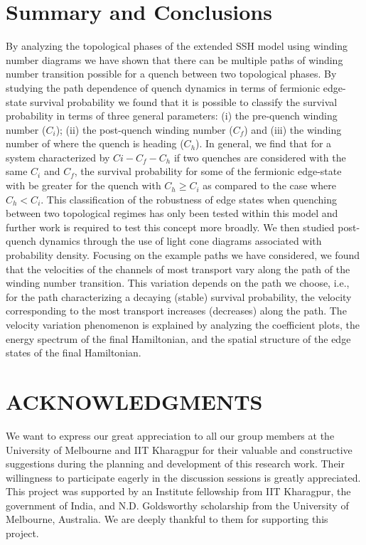 \documentclass[aps,pra,reprint,superscriptaddress,longbibliography]{revtex4-2}
\begin{document}
   \section{Summary and Conclusions}
By analyzing the topological phases of the extended SSH model using winding number diagrams we have shown that there can be multiple paths of winding number transition possible for a quench between two topological phases. By studying the path dependence of quench dynamics in terms of fermionic edge-state survival probability we found that it is possible to classify the survival probability in terms of three general parameters: (i) the pre-quench winding number ($C_i$); (ii) the post-quench winding number ($C_f$) and (iii) the winding number of where the quench is heading ($C_h$). In general, we find that for a system characterized by $Ci-C_f-C_h$ if two quenches are considered with the same $C_i$ and $C_f$, the survival probability for some of the fermionic edge-state with be greater for the quench with $C_h \ge C_i$ as compared to the case where $C_h<C_i$.  This classification of the robustness of edge states when quenching between two topological regimes has only been tested within this model and further work is required to test this concept more broadly.  We then studied post-quench dynamics through the use of light cone diagrams associated with probability density. Focusing on the example paths we have considered, we found that the velocities of the channels of most transport vary along the path of the winding number transition. This variation depends on the path we choose, i.e., for the path characterizing a decaying (stable) survival probability, the velocity corresponding to the most transport increases (decreases) along the path. The velocity variation phenomenon is explained by analyzing the coefficient plots, the energy spectrum of the final Hamiltonian, and the spatial structure of the edge states of the final Hamiltonian.

	\section*{ACKNOWLEDGMENTS}
We want to express our great appreciation to all our group members at the University of Melbourne and IIT Kharagpur for their valuable and constructive suggestions during the planning and development of this research work. Their willingness to participate eagerly in the discussion sessions is greatly appreciated.
This project was supported by an Institute fellowship from IIT Kharagpur, the government of India, and N.D. Goldsworthy scholarship from the University of Melbourne, Australia. We are deeply thankful to them for supporting this project.






\end{document}
